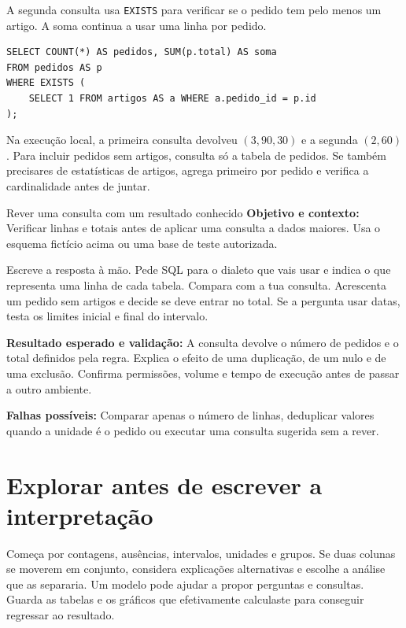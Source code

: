 \noindent\begin{minipage}{\linewidth}
A segunda consulta usa \texttt{EXISTS} para verificar se o pedido tem pelo menos um artigo. A soma continua a usar uma linha por pedido.
\begin{lstlisting}
SELECT COUNT(*) AS pedidos, SUM(p.total) AS soma
FROM pedidos AS p
WHERE EXISTS (
    SELECT 1 FROM artigos AS a WHERE a.pedido_id = p.id
);
\end{lstlisting}
\end{minipage}

Na execução local, a primeira consulta devolveu $(3,90,30)$ e a segunda $(2,60)$. Para incluir pedidos sem artigos, consulta só a tabela de pedidos. Se também precisares de estatísticas de artigos, agrega primeiro por pedido e verifica a cardinalidade antes de juntar.

\begin{promptlabbox}{Rever uma consulta com um resultado conhecido}
\textbf{Objetivo e contexto:} Verificar linhas e totais antes de aplicar uma consulta a dados maiores. Usa o esquema fictício acima ou uma base de teste autorizada.

Escreve a resposta à mão. Pede SQL para o dialeto que vais usar e indica o que representa uma linha de cada tabela. Compara com a tua consulta. Acrescenta um pedido sem artigos e decide se deve entrar no total. Se a pergunta usar datas, testa os limites inicial e final do intervalo.

\textbf{Resultado esperado e validação:} A consulta devolve o número de pedidos e o total definidos pela regra. Explica o efeito de uma duplicação, de um nulo e de uma exclusão. Confirma permissões, volume e tempo de execução antes de passar a outro ambiente.

\textbf{Falhas possíveis:} Comparar apenas o número de linhas, deduplicar valores quando a unidade é o pedido ou executar uma consulta sugerida sem a rever.
\end{promptlabbox}

\section{Explorar antes de escrever a interpretação}

Começa por contagens, ausências, intervalos, unidades e grupos. Se duas colunas se moverem em conjunto, considera explicações alternativas e escolhe a análise que as separaria. Um modelo pode ajudar a propor perguntas e consultas. Guarda as tabelas e os gráficos que efetivamente calculaste para conseguir regressar ao resultado.

